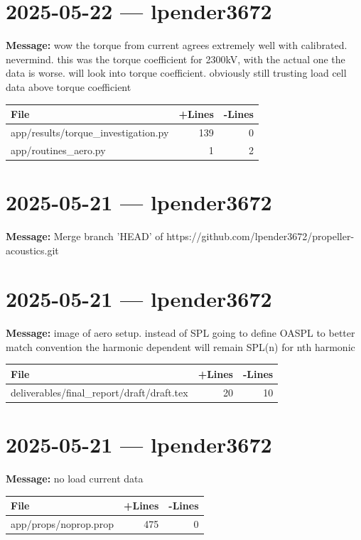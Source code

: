 \documentclass{article}
\begin{document}
\section*{2025-05-22 --- lpender3672}
\textbf{Message:} wow the torque from current agrees extremely well with calibrated. nevermind. this was the torque coefficient for 2300kV, with the actual one the data is worse. will look into torque coefficient. obviously still trusting load cell data above torque coefficient

\begin{longtable}{|p{10cm}|r|r|}
\hline \textbf{File} & \textbf{+Lines} & \textbf{-Lines} \\
\hline
app/results/torque\_investigation.py & 139 & 0 \\
\hline
app/routines\_aero.py & 1 & 2 \\
\hline
\end{longtable}

\section*{2025-05-21 --- lpender3672}
\textbf{Message:} Merge branch 'HEAD' of https://github.com/lpender3672/propeller-acoustics.git

\section*{2025-05-21 --- lpender3672}
\textbf{Message:} image of aero setup. instead of SPL going to define OASPL to better match convention the harmonic dependent will remain SPL(n) for nth harmonic

\begin{longtable}{|p{10cm}|r|r|}
\hline \textbf{File} & \textbf{+Lines} & \textbf{-Lines} \\
\hline
deliverables/final\_report/draft/draft.tex & 20 & 10 \\
\hline
\end{longtable}

\section*{2025-05-21 --- lpender3672}
\textbf{Message:} no load current data

\begin{longtable}{|p{10cm}|r|r|}
\hline \textbf{File} & \textbf{+Lines} & \textbf{-Lines} \\
\hline
app/props/noprop.prop & 475 & 0 \\
\hline
\end{longtable}
\end{document}
